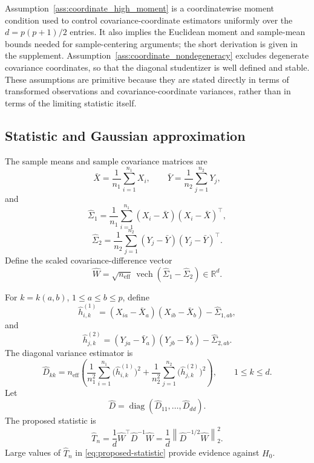 \documentclass[
  12pt]{article}
\theoremstyle{plain}
\theoremstyle{definition}
\theoremstyle{remark}
\begin{document}
Assumption~\ref{ass:coordinate_high_moment} is a coordinatewise moment
condition used to control covariance-coordinate estimators uniformly over the
\(d=p(p+1)/2\) entries.  It also implies the Euclidean moment and sample-mean
bounds needed for sample-centering arguments; the short derivation is given in
the supplement.  Assumption~\ref{ass:coordinate_nondegeneracy} excludes
degenerate covariance coordinates, so that the diagonal studentizer is well
defined and stable.  These assumptions are primitive because they are stated
directly in terms of transformed observations and covariance-coordinate
variances, rather than in terms of the limiting statistic itself.

\subsection{Statistic and Gaussian approximation}
\label{subsec:statistic_gaussian}

The sample means and sample covariance matrices are
\[
\bar X=\frac1{n_1}\sum_{i=1}^{n_1}X_i,
\qquad
\bar Y=\frac1{n_2}\sum_{j=1}^{n_2}Y_j,
\]
and
\[
\widehat\Sigma_1
=
\frac1{n_1}\sum_{i=1}^{n_1}(X_i-\bar X)(X_i-\bar X)^\top,
\]
\[
\widehat\Sigma_2
=
\frac1{n_2}\sum_{j=1}^{n_2}(Y_j-\bar Y)(Y_j-\bar Y)^\top.
\]
Define the scaled covariance-difference vector
\begin{equation}
\label{eq:scaled-difference}
\widehat W
=
\sqrt{n_{\mathrm{eff}}}\,
\operatorname{vech}(\widehat\Sigma_1-\widehat\Sigma_2)
\in\mathbb R^d.
\end{equation}

For \(k=k(a,b)\), \(1\le a\le b\le p\), define
\[
\widehat h_{i,k}^{(1)}
=
(X_{ia}-\bar X_a)(X_{ib}-\bar X_b)
-
\widehat\Sigma_{1,ab},
\]
and
\[
\widehat h_{j,k}^{(2)}
=
(Y_{ja}-\bar Y_a)(Y_{jb}-\bar Y_b)
-
\widehat\Sigma_{2,ab}.
\]
The diagonal variance estimator is
\begin{equation}
\label{eq:diagonal-studentizer}
\widehat D_{kk}
=
n_{\mathrm{eff}}
\left(
\frac1{n_1^2}
\sum_{i=1}^{n_1}
\bigl(\widehat h_{i,k}^{(1)}\bigr)^2
+
\frac1{n_2^2}
\sum_{j=1}^{n_2}
\bigl(\widehat h_{j,k}^{(2)}\bigr)^2
\right),
\qquad 1\le k\le d.
\end{equation}
Let
\[
\widehat D=\operatorname{diag}(\widehat D_{11},\ldots,\widehat D_{dd}).
\]
The proposed statistic is
\begin{equation}
\label{eq:proposed-statistic}
\widehat T_n
=
\frac1d
\widehat W^\top\widehat D^{-1}\widehat W
=
\frac1d
\left\|
\widehat D^{-1/2}\widehat W
\right\|_2^2.
\end{equation}
Large values of \(\widehat T_n\) in \eqref{eq:proposed-statistic} provide
evidence against \(H_0\).
\end{document}

